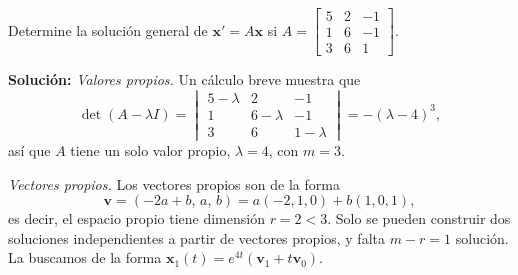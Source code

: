 \begin{example}\label{ex:3x3}
Determine la soluci\'on general de $\mathbf{x}' = A\mathbf{x}$ si $A = \begin{bmatrix} 5 & 2 & -1 \\ 1 & 6 & -1 \\ 3 & 6 & 1 \end{bmatrix}$.

\noindent \textbf{Soluci\'on:} \emph{Valores propios.} Un c\'alculo breve muestra que
\[
\det(A - \lambda I) = \begin{vmatrix} 5-\lambda & 2 & -1 \\ 1 & 6-\lambda & -1 \\ 3 & 6 & 1-\lambda \end{vmatrix} = -(\lambda - 4)^3,
\]
as\'i que $A$ tiene un solo valor propio, $\lambda = 4$, con $m=3$.

\emph{Vectores propios.} Los vectores propios son de la forma
\begin{equation}\label{eq:vp3x3}
\mathbf{v} = (-2a+b,\, a,\, b) = a(-2, 1, 0) + b(1, 0, 1),
\end{equation}
es decir, el espacio propio tiene dimensi\'on $r=2<3$. Solo se pueden construir dos soluciones independientes a partir de vectores propios, y falta $m-r=1$ soluci\'on. La buscamos de la forma $\mathbf{x}_1(t) = e^{4t}(\mathbf{v}_1 + t\mathbf{v}_0)$.


\end{example}
